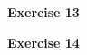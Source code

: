\documentclass[12pt,oneside]{article}
\newenvironment{exercise}[1]{\vspace{.1in}\noindent\textbf{Exercise #1 \hspace{.05em}}}{}
\begin{document}

\begin{exercise}{13}

\end{exercise}


\begin{exercise}{14}

\end{exercise}


\end{document}
